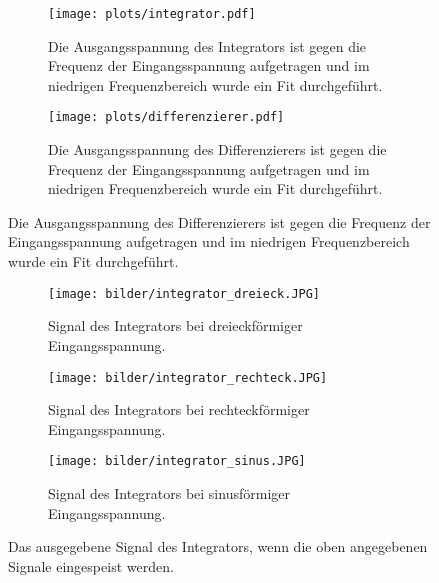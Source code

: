     \begin{figure}
        \centering
        \begin{subfigure}[b]{0.5\textwidth}
            \centering
            \texttt{[image: plots/integrator.pdf]}
            \caption{Die Ausgangsspannung des Integrators ist gegen die Frequenz der Eingangsspannung aufgetragen und im niedrigen Frequenzbereich wurde ein Fit durchgeführt.}
            \vspace*{2cm}
            \label{fig:integrator1}
        \end{subfigure}

        \begin{subfigure}[b]{0.5\textwidth}
            \centering
            \texttt{[image: plots/differenzierer.pdf]}
            \caption{Die Ausgangsspannung des Differenzierers ist gegen die Frequenz der Eingangsspannung aufgetragen und im niedrigen Frequenzbereich wurde ein Fit durchgeführt.}
            \label{fig:differenzierer1}
        \end{subfigure}
    \end{figure}
    \FloatBarrier

    \begin{figure}
        \centering
        \begin{subfigure}[b]{0.48\textwidth}
            \centering
            \texttt{[image: bilder/integrator\_dreieck.JPG]}
            \caption{Signal des Integrators bei dreieckförmiger Eingangsspannung.}
            \vspace*{1cm}
            \label{fig:integrator_dreieck}
        \end{subfigure}
    
        \begin{subfigure}[b]{0.48\textwidth}
            \centering
            \texttt{[image: bilder/integrator\_rechteck.JPG]}
            \caption{Signal des Integrators bei rechteckförmiger Eingangsspannung.}
            \vspace*{1cm}
            \label{fig:integrator_rechteck}
        \end{subfigure}

        \begin{subfigure}[b]{0.48\textwidth}
            \centering
            \texttt{[image: bilder/integrator\_sinus.JPG]}
            \caption{Signal des Integrators bei sinusförmiger Eingangsspannung.}
            \label{fig:integrator_sinus}
        \end{subfigure}
        \caption{Das ausgegebene Signal des Integrators, wenn die oben angegebenen Signale eingespeist werden.}
        \label{fig:integrator_signale}
    \end{figure}
    \FloatBarrier

